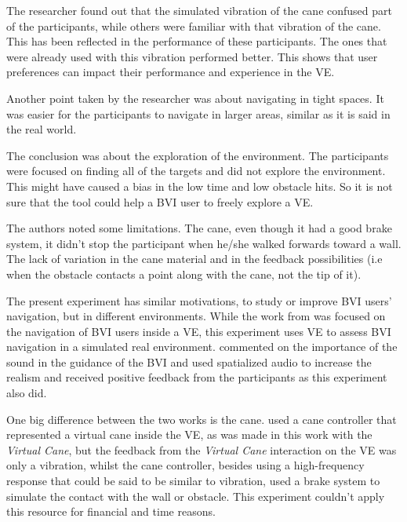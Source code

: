 The researcher found out that the simulated vibration of the cane confused part of the participants, while others were familiar with that vibration of the cane. This has been reflected in the performance of these participants. The ones that were already used with this vibration performed better. This shows that user preferences can impact their performance and experience in the VE. 

Another point taken by the researcher was about navigating in tight spaces. It was easier for the participants to navigate in larger areas, similar as it is said in the real world. 

The conclusion was about the exploration of the environment. The participants were focused on finding all of the targets and did not explore the environment. This might have caused a bias in the low time and low obstacle hits. So it is not sure that the tool could help a BVI user to freely explore a VE.

The authors noted some limitations. The cane, even though it had a good brake system, it didn't stop the participant when he/she walked forwards toward a wall. The lack of variation in the cane material and in the feedback possibilities (i.e when the obstacle contacts a point along with the cane, not the tip of it).

The present experiment has similar motivations, to study or improve BVI users' navigation, but in different environments. While the work from \citeauthor{siu2020virtual} was focused on the navigation of BVI users inside a VE, this experiment uses VE to assess BVI navigation in a simulated real environment. \citeauthor{siu2020virtual} commented on the importance of the sound in the guidance of the BVI and used spatialized audio to increase the realism and received positive feedback from the participants as this experiment also did.

One big difference between the two works is the cane. \citeauthor{siu2020virtual} used a cane controller that represented a virtual cane inside the VE, as was made in this work with the \textit{Virtual Cane}, but the feedback from the \textit{Virtual Cane} interaction on the VE was only a vibration, whilst the cane controller, besides using a high-frequency response that could be said to be similar to vibration,  used a brake system to simulate the contact with the wall or obstacle. This experiment couldn't apply this resource for financial and time reasons.